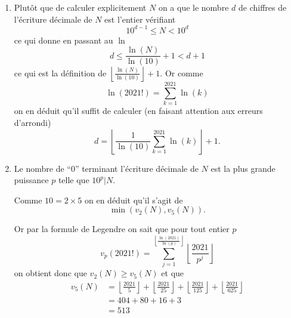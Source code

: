 \begin{sol}
    \begin{enumerate}
        \item Plutôt que de calculer explicitement $N$ on a que le nombre $d$ de chiffres de l'écriture décimale de $N$ est l'entier vérifiant
              \[10^{d-1} \leq N < 10^{d}\]
              ce qui donne en passant au $\ln$
              \[d \leq \frac{\ln(N)}{\ln(10)}+1 < d+1\]
              ce qui est la définition de $\left\lfloor \frac{\ln(N)}{\ln(10)} \right\rfloor+1$. Or comme
              \[\ln(2021!) = \sum_{k=1}^{2021} \ln(k)\]
              on en déduit qu'il suffit de calculer (en faisant attention aux erreurs d'arrondi)
              \[ \boxed{d = \left\lfloor \frac{1}{\ln(10)} \sum_{k=1}^{2021} \ln(k) \right\rfloor +1}.\]
        \item Le nombre de ``$0$'' terminant l'écriture décimale de $N$ est la plus grande puissance $p$ telle que $10^p | N$.

              Comme $10 = 2 \times 5$ on en déduit qu'il s'agit de
              \[\min(v_2(N),v_5(N)).\]

              Or par la formule de Legendre on sait que pour tout entier $p$
              \[v_p(2021!) = \sum_{j=1}^{\left\lfloor \frac{\ln(2021)}{\ln(p)} \right\rfloor} \left\lfloor \frac{2021}{p^j} \right\rfloor\]
              on obtient donc que $v_2(N) \geq v_5(N)$ et que
              \[\begin{aligned}
                      v_5(N) & =  \left\lfloor \frac{2021}{5} \right\rfloor + \left\lfloor \frac{2021}{25} \right\rfloor +\left\lfloor \frac{2021}{125} \right\rfloor + \left\lfloor \frac{2021}{625} \right\rfloor \\
                             & = 404 + 80 + 16 +3                                                                                                                                                                   \\
                             & = \boxed{513}
                  \end{aligned}\]
    \end{enumerate}
\end{sol}


